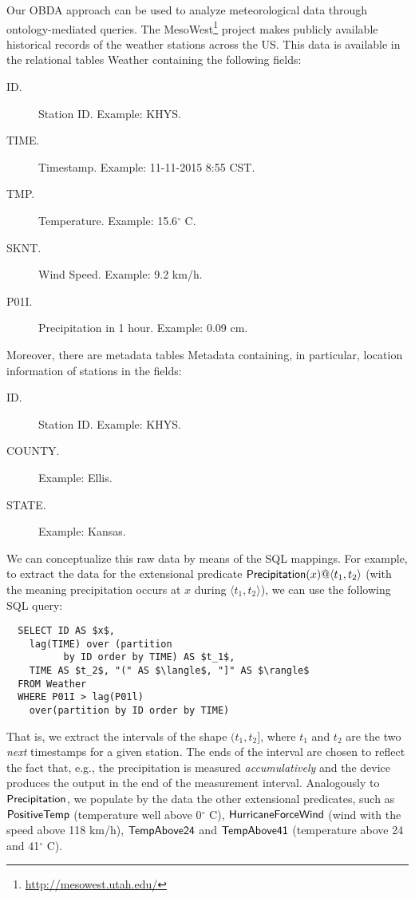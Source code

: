 \documentclass{article}
\begin{document}
{{Our OBDA approach can be used to analyze meteorological data through ontology-mediated queries. The Meso\-West\footnote{\url{http://mesowest.utah.edu/}} project makes publicly available historical records of the weather stations across the US. This data is available in the relational tables {\sf Weather} containing the following fields:
%
\begin{description}
  \item[{\sf ID}.] Station ID. Example: KHYS.
  \item[{\sf TIME}.] Timestamp. Example: 11-11-2015 8:55 CST.
  \item[{\sf TMP}.] Temperature. Example: 15.6$^\circ$ C.
  \item[{\sf SKNT}.] Wind Speed. Example: 9.2 km/h.
  \item[{\sf P01I}.] Precipitation in 1 hour. Example: 0.09 cm.
\end{description}
%
Moreover, there are metadata tables {\sf Metadata} containing, in particular, location information of stations in the fields:
%
\begin{description}
  \item[{\sf ID}.] Station ID. Example: KHYS.
  \item[{\sf COUNTY.}] Example: Ellis.
  \item[{\sf STATE.}] Example: Kansas.
\end{description}
%
We can conceptualize this raw data by means of the SQL mappings. For
example, to extract the data for the extensional predicate
${\sf Precipitation}(x)@\langle t_1, t_2 \rangle$ (with the meaning
precipitation occurs at $x$ during $\langle t_1, t_2 \rangle$), we can use the following SQL query:
%
\begin{lstlisting}
  SELECT ID AS $x$,
    lag(TIME) over (partition
          by ID order by TIME) AS $t_1$,
    TIME AS $t_2$, "(" AS $\langle$, "]" AS $\rangle$
  FROM Weather
  WHERE P01I > lag(P01l)
    over(partition by ID order by TIME)
\end{lstlisting}
%
That is, we extract the intervals of the shape $(t_1, t_2]$, where $t_1$ and $t_2$ are the two \emph{next} timestamps for a given station. The ends of the interval are chosen to reflect the fact that, e.g., the precipitation is measured \emph{accumulatively} and the device produces the output in the end of the measurement interval. Analogously to ${\sf Precipitation}$, we populate by the data the other extensional predicates, such as ${\sf PositiveTemp}$ (temperature well above 0$^\circ$ C), ${\sf HurricaneForceWind}$ (wind with the speed above 118 km/h), ${\sf TempAbove24}$ and ${\sf TempAbove41}$ (temperature above 24 and 41$^\circ$ C).

}}
\end{document}
